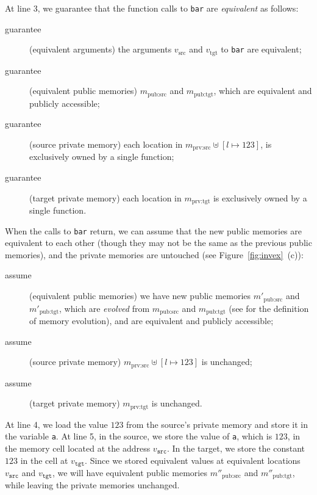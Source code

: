 At line 3, we guarantee that the function calls to \texttt{bar} are
\emph{equivalent} as follows:
\begin{description}
\item[guarantee] (equivalent arguments) 
  the arguments $v_\textrm{src}$ and $v_\textrm{tgt}$ to \texttt{bar} are equivalent; 
\item[guarantee] (equivalent public memories) 
  $m_\textrm{pub:src}$ and $m_\textrm{pub:tgt}$,
  which are equivalent and publicly accessible;
\item[guarantee] (source private memory) 
  each location in $m_\textrm{prv:src} \uplus {[l\mapsto 123]}$,
  is exclusively owned by a single function;
\item[guarantee] (target private memory) 
  each location in $m_\textrm{prv:tgt}$
  is exclusively owned by a single function.
\end{description}
When the calls to \texttt{bar} return,
we can assume that the new public
memories are equivalent to each other (though they may not be the same as the previous public memories), and
the private memories are untouched (see Figure~\ref{fig:invex}~(c)):
\begin{description}
\item[assume] (equivalent public memories) we have new public memories $m'_\textrm{pub:src}$ and
  $m'_\textrm{pub:tgt}$, which are \emph{evolved} from $m_\textrm{pub:src}$
  and $m_\textrm{pub:tgt}$ (see  for the definition of memory evolution), and 
  are equivalent and publicly accessible;
\item[assume] (source private memory) $m_\textrm{prv:src} \uplus
  {[l\mapsto 123]}$ is unchanged;
\item[assume] (target private memory) $m_\textrm{prv:tgt}$ is
  unchanged.
\end{description}

At line 4, we load the value $123$ from the source's private memory and
store it in the variable \texttt{a}.  At line 5, in the source, we
store the value of \texttt{a}, which is $123$, in the memory cell located at
the address $v_\texttt{src}$.  In the target, we store the constant
$123$ in the cell at $v_\texttt{tgt}$. Since we stored equivalent
values at equivalent locations $v_\texttt{src}$ and $v_\texttt{tgt}$,
we will have equivalent public memories $m''_\textrm{pub:src}$ and
$m''_\textrm{pub:tgt}$, while leaving the private memories unchanged.

